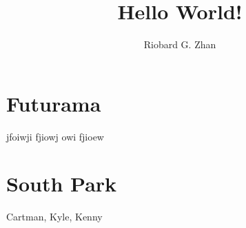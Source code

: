 \documentclass{article}
\author{Riobard G. Zhan}
\title{Hello World!}
\begin{document}
\section{Futurama}

jfoiwji fjiowj owi fjioew 


\section{South Park}

Cartman, Kyle, Kenny
\end{document}
